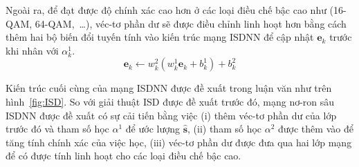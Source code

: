 Ngoài ra, để đạt được độ chính xác cao hơn ở các loại điều chế bậc cao như (16-QAM, 64-QAM,~\ldots), véc-tơ phần dư sẽ được điều chỉnh linh hoạt hơn bằng cách thêm hai bộ biến đổi tuyến tính vào kiến trúc mạng ISDNN để cập nhật $\mathbf{e}_k$ trước khi nhân với $\alpha^1_k$.
\begin{equation}
\mathbf{e}_k \leftarrow w^2_{k}\left(w^1_{k} \mathbf{e}_k+b^1_{k}\right)+b^2_{k}
\end{equation}

Kiến trúc cuối cùng của mạng ISDNN được đề xuất trong luận văn như trên hình~\ref{fig:ISD}. So với giải thuật ISD được đề xuất trước đó, mạng nơ-ron sâu ISDNN được đề xuất có sự cải tiến bằng việc (i) thêm véc-tơ phần dư của lớp trước đó và tham số học $\alpha^1$ để ước lượng $\hat{\mathbf{s}}$, (ii) tham số học $\alpha^2$ được thêm vào để tăng tính chính xác của việc học, (iii) véc-tơ phần dư được đưa qua hai lớp mạng để có được tính linh hoạt cho các loại điều chế bậc cao.
